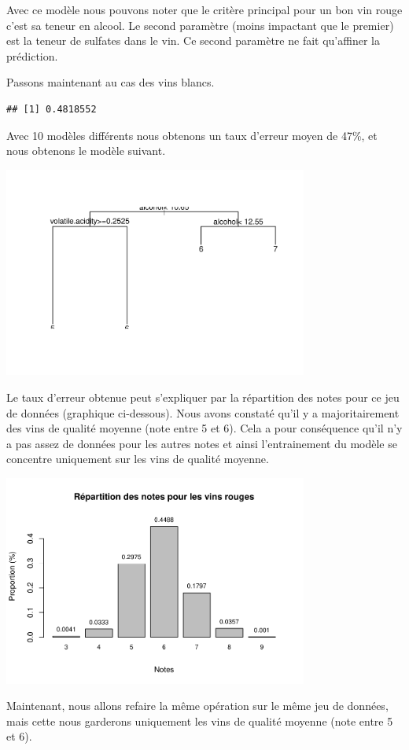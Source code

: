 \documentclass[
]{article}
\begin{document}
Avec ce modèle nous pouvons noter que le critère principal pour un bon
vin rouge c'est sa teneur en alcool. Le second paramètre (moins
impactant que le premier) est la teneur de sulfates dans le vin. Ce
second paramètre ne fait qu'affiner la prédiction.

Passons maintenant au cas des vins blancs.

\begin{verbatim}
## [1] 0.4818552
\end{verbatim}

Avec 10 modèles différents nous obtenons un taux d'erreur moyen de 47\%,
et nous obtenons le modèle suivant.

\begin{center}
	\includegraphics[width=10cm]{repport_files/figure-latex/unnamed-chunk-27-1.pdf}
\end{center}

Le taux d'erreur obtenue peut s'expliquer par la répartition des notes
pour ce jeu de données (graphique ci-dessous). Nous avons constaté qu'il
y a majoritairement des vins de qualité moyenne (note entre 5 et 6).
Cela a pour conséquence qu'il n'y a pas assez de données pour les autres
notes et ainsi l'entrainement du modèle se concentre uniquement sur les
vins de qualité moyenne.

\begin{center}
	\includegraphics[width=10cm]{repport_files/figure-latex/unnamed-chunk-28-1.pdf}
\end{center}
Maintenant, nous allons refaire la même opération sur le même jeu de
données, mais cette nous garderons uniquement les vins de qualité
moyenne (note entre 5 et 6).
\end{document}
